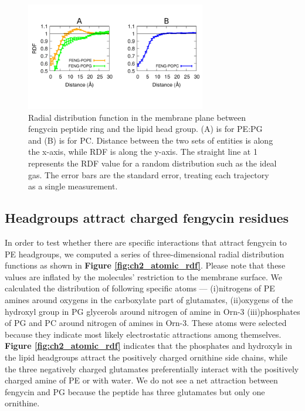 \begin{figure}
\centering
\includegraphics[width=0.7\textwidth]{chapter2_figs/feng_mem_corr.pdf}
\caption{\label{fig:ch2_xyrdf_mem} Radial distribution function in the membrane plane between
fengycin peptide ring and the lipid head group. (A) is for PE:PG and (B) is for PC.
Distance between the two sets of entities
is along the x-axis, while RDF is along the y-axis.
The straight line at 1 represents the RDF value for a
random distribution such as the ideal gas. The error bars are the standard error, treating each trajectory as a single measurement.
}
\end{figure}

\subsection{Headgroups attract charged fengycin residues}
\label{subsec:atomicrdf}
In order to test whether there are specific interactions that attract fengycin
to PE headgroups, we computed a series of three-dimensional radial distribution
functions as shown in \textbf{Figure \ref{fig:ch2_atomic_rdf}}.
 Please note that these values are inflated by the molecules' restriction to the membrane surface.
 We calculated the distribution of following specific atoms ---
(i)nitrogens of PE amines around oxygens in the carboxylate part of glutamates,
(ii)oxygens of the hydroxyl group in PG glycerols around nitrogen of amine in Orn-3
(iii)phosphates of PG and PC around nitrogen of amines in Orn-3.
These atoms were selected because they indicate most likely electrostatic attractions among themselves.
\textbf{Figure \ref{fig:ch2_atomic_rdf}} indicates that the phosphates and
hydroxyls in the lipid headgroups attract the positively charged ornithine side
chains, while the three negatively charged glutamates preferentially interact
with the positively charged amine of PE or with water. We do not see a net
attraction between fengycin and PG because the peptide has three glutamates but only
one ornithine.

